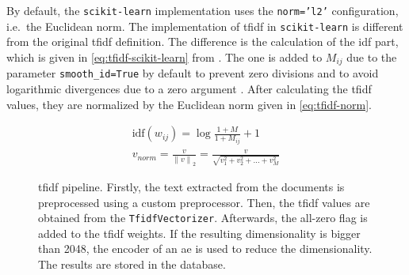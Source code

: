By default, the \texttt{scikit-learn} implementation uses the \texttt{norm='l2'} configuration, i.e.\ the Euclidean norm.
The implementation of \ac{tfidf} in \texttt{scikit-learn} is different from the original \ac{tfidf} definition.
The difference is the calculation of the \ac{idf} part, which is given in \autoref{eq:tfidf-scikit-learn} from \cite{tfidf-scikit-learn}.
The one is added to $M_{ij}$ due to the parameter \texttt{smooth\_id=True} by default to prevent zero divisions 
and to avoid logarithmic divergences due to a zero argument \cite{glove2014}.
After calculating the \ac{tfidf} values, they are normalized by the Euclidean norm given in \autoref{eq:tfidf-norm}.

\begin{align}
    \text{idf}(w_{ij}) = \log \frac{1 + M}{1 + M_{ij}} + 1\label{eq:tfidf-scikit-learn}\\
    v_{norm} = \frac{v}{\left\| v \right\|_{2}} = \frac{v}{\sqrt{v_1^{2} + v_2^{2} + ... + v_M^{2}}}\label{eq:tfidf-norm}
\end{align}

\begin{figure}[!htb] %
    \centering
    
    \caption[\acs*{tfidf} pipeline]{\acs*{tfidf} pipeline.
    Firstly, the text extracted from the documents is preprocessed using a custom preprocessor.
    Then, the \acs*{tfidf} values are obtained from the \texttt{TfidfVectorizer}.
    Afterwards, the all-zero flag is added to the \acs*{tfidf} weights.
    If the resulting dimensionality is bigger than 2048, the encoder of an \acs*{ae} is used to reduce the dimensionality.
    The results are stored in the database.
    }
    \label{fig:tfidf_embedding}
\end{figure}

